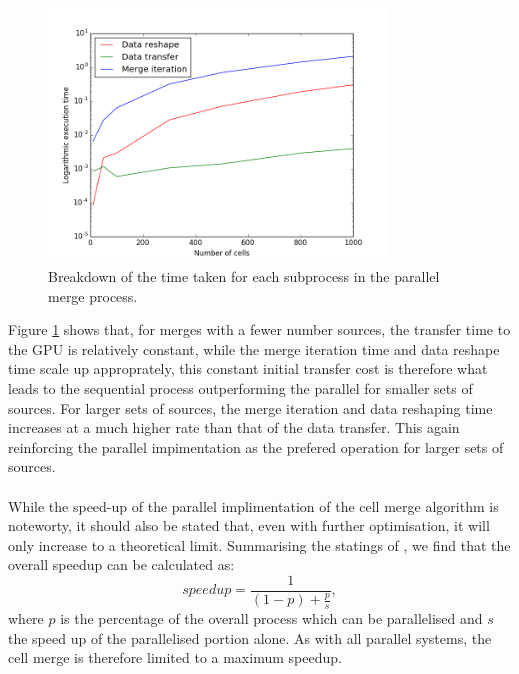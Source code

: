 \begin{figure}[H]
\centering
\includegraphics[width=0.8\textwidth]{Images/result_profile.png}
\caption{Breakdown of the time taken for each subprocess in the parallel merge process.}
\label{res:fig:prof}
\end{figure}
Figure \ref{res:fig:prof} shows that, for merges with a fewer number sources, the transfer time to the GPU is relatively constant, while the merge iteration time and data reshape time scale up approprately, this constant initial transfer cost is therefore what leads to the sequential process outperforming the parallel for smaller sets of sources. For larger sets of sources, the merge iteration and data reshaping time increases at a much higher rate than that of the data transfer.  This again reinforcing the parallel impimentation as the prefered operation for larger sets of sources.
\\
\\
While the speed-up of the parallel implimentation of the cell merge algorithm is noteworty, it should also be stated that, even with further optimisation, it will only increase to a theoretical limit. Summarising the statings of \citep{amdahl1967validity}, we find that the overall speedup can be calculated as:
\begin{equation}
	speedup = \frac{1}{(1-p)+\frac{p}{s}},
\end{equation}
where $p$ is the percentage of the overall process which can be parallelised and $s$ the speed up of the parallelised portion alone. As with all parallel systems, the cell merge is therefore limited to a maximum speedup.